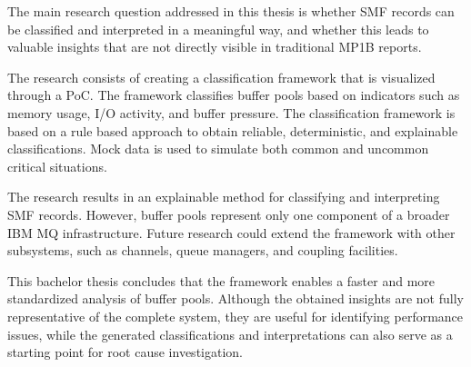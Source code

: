 The main research question addressed in this thesis is whether SMF records can be classified and interpreted in a meaningful way, and whether this leads to 
valuable insights that are not directly visible in traditional MP1B reports.

The research consists of creating a classification framework that is visualized through a PoC. 
The framework classifies buffer pools based on indicators such as memory usage, I/O activity, and buffer pressure. 
The classification framework is based on a rule based approach to obtain reliable, deterministic, and explainable classifications.
Mock data is used to simulate both common and uncommon critical situations.

The research results in an explainable method for classifying and interpreting SMF records. 
However, buffer pools represent only one component of a broader IBM MQ infrastructure. Future research could extend the framework with other subsystems, such as channels, queue managers, and coupling facilities. 

This bachelor thesis concludes that the framework enables a faster and more standardized analysis of buffer pools. Although the obtained insights are not fully representative
of the complete system, they are useful for identifying performance issues, while the generated classifications and interpretations can also serve as a starting point for root cause investigation.


